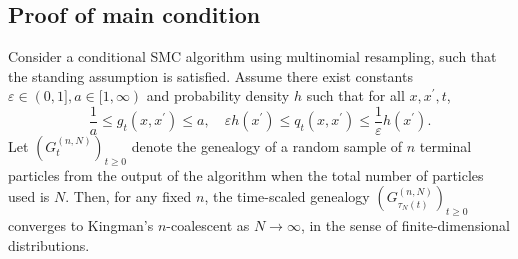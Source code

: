 \subsection{Proof of main condition}

\begin{corollary}\label{thm:CSMC_newassns}
Consider a conditional SMC algorithm using multinomial resampling, such that the standing assumption is satisfied. Assume there exist constants $\varepsilon\in (0,1], a\in [1,\infty)$ and probability density $h$ such that for all $x, x^\prime, t$,
\begin{equation}\label{eq:gq_bounds_csmc}
\frac{1}{a} \leq g_t(x, x^\prime) \leq a , \quad
\varepsilon h(x^\prime) \leq q_t(x, x^\prime) \leq \frac{1}{\varepsilon} h(x^\prime) .
\end{equation}
Let $(G_t^{(n,N)})_{t\geq0}$ denote the genealogy of a random sample of $n$ terminal particles from the output of the algorithm when the total number of particles used is $N$. Then, for any fixed $n$, the time-scaled genealogy $(G_{\tau_N(t)}^{(n,N)})_{t\geq0}$ converges to Kingman's $n$-coalescent as $N\to \infty$, in the sense of finite-dimensional distributions.
\end{corollary}

